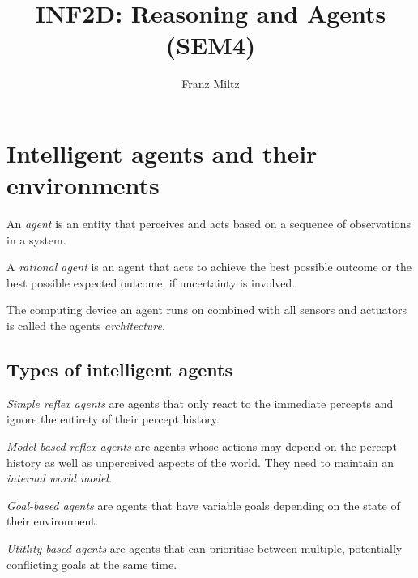 \documentclass{article}
\title{INF2D: Reasoning and Agents (SEM4)}
\author{Franz Miltz}
\begin{document}
\maketitle
\tableofcontents
\pagebreak

\section{Intelligent agents and their environments}

\begin{definition}
    An \emph{agent} is an entity that perceives and
    acts based on a sequence of observations in a system.
\end{definition}

\begin{definition}
    A \emph{rational agent} is an agent that acts to achieve
    the best possible outcome or the best possible expected
    outcome, if uncertainty is involved.
\end{definition}

\begin{definition}
    The computing device an agent runs on combined with all sensors and actuators
    is called the agents \emph{architecture}.
\end{definition}

\subsection{Types of intelligent agents}

\begin{definition}
    \emph{Simple reflex agents} are agents that only react to the immediate percepts
    and ignore the entirety of their percept history.
\end{definition}

\begin{definition}
    \emph{Model-based reflex agents} are agents whose actions may depend on the
    percept history as well as unperceived aspects of the world. They need to
    maintain an \emph{internal world model}.
\end{definition}

\begin{definition}
    \emph{Goal-based agents} are agents that have variable goals depending on the
    state of their environment.
\end{definition}

\begin{definition}
    \emph{Utitlity-based agents} are agents that can prioritise between multiple, 
    potentially conflicting goals at the same time.
\end{definition}
\end{document}
